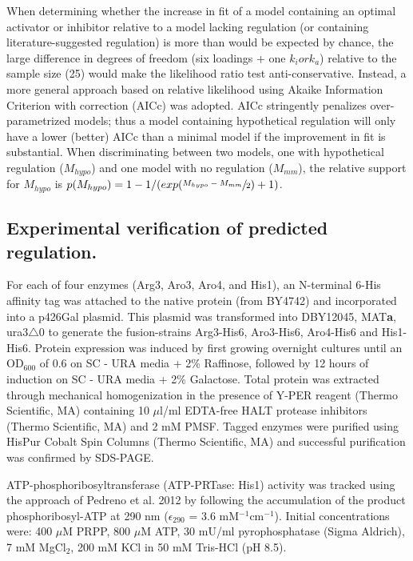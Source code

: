When determining whether the increase in fit of a model containing an optimal activator or inhibitor relative to a model lacking regulation (or containing literature-suggested regulation) is more than would be expected by chance, the large difference in degrees of freedom (six loadings + one $k_{i} or k_{a}$) relative to the sample size (25) would make the likelihood ratio test anti-conservative.  Instead, a more general approach based on relative likelihood using Akaike Information Criterion with correction (AICc) was adopted.  AICc stringently penalizes over-parametrized models; thus a model containing hypothetical regulation will only have a lower (better) AICc than a minimal model if the improvement in fit is substantial.  When discriminating between two models, one with hypothetical regulation ($M_{hypo}$) and one model with no regulation ($M_{mm}$), the relative support for $M_{hypo}$ is $p(M_{hypo}) = 1 - 1/(exp(\sfrac{M_{hypo} - M_{mm}}{2}) + 1)$.

\subsection*{Experimental verification of predicted regulation.}

For each of four enzymes (Arg3, Aro3, Aro4, and His1), an N-terminal 6-His affinity tag was attached to the native protein (from BY4742) and incorporated into a p426Gal plasmid.  This plasmid was transformed into DBY12045, MAT\textbf{a}, ura3$\bigtriangleup$0 to generate the fusion-strains Arg3-His6, Aro3-His6, Aro4-His6 and His1-His6.  Protein expression was induced by first growing overnight cultures until an OD$_{600}$ of 0.6 on SC - URA media + 2\% Raffinose, followed by 12 hours of induction on SC - URA media + 2\% Galactose.  Total protein was extracted through mechanical homogenization in the presence of Y-PER reagent (Thermo Scientific, MA) containing 10 $\mu$l/ml EDTA-free HALT protease inhibitors (Thermo Scientific, MA) and 2 mM PMSF.  Tagged enzymes were purified using HisPur Cobalt Spin Columns (Thermo Scientific, MA) and successful purification was confirmed by SDS-PAGE.

ATP-phosphoribosyltransferase (ATP-PRTase: His1) activity was tracked using the approach of Pedreno et al. 2012 \cite{Pedreno:2012hv} by following the accumulation of the product phosphoribosyl-ATP at 290 nm ($\epsilon_{290}$ = 3.6 mM$^{-1}$cm$^{-1}$).  Initial concentrations were: 400 $\mu$M PRPP, 800 $\mu$M ATP, 30 mU/ml pyrophosphatase (Sigma Aldrich), 7 mM MgCl$_{2}$, 200 mM KCl in 50 mM Tris-HCl (pH 8.5).

